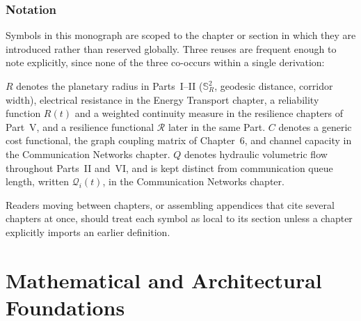 \documentclass[11pt,fleqn]{book}
\numberwithin{equation}{chapter}
\theoremstyle{plain}
\theoremstyle{definition}
\theoremstyle{remark}
\newcommand{\Sphere}{\mathbb{S}^{2}}
\begin{document}
\begin{abstract}
The resulting blueprint is developmental rather than terminal. Regions may construct low-capability implementations while retaining compatibility with more advanced sections elsewhere. Models, survey monuments, roads, hydraulic works, electrical systems, and megastructures can all instantiate the same protocol at different scales. Civilizations separated by centuries may therefore converge upon a common architecture without requiring synchronized construction, uniform technology, or a permanently centralized authority.
\end{abstract}

\tableofcontents

\section*{Notation}

Symbols in this monograph are scoped to the chapter or section in which
they are introduced rather than reserved globally. Three reuses are
frequent enough to note explicitly, since none of the three co-occurs
within a single derivation:

\(R\) denotes the planetary radius in Parts~I--II (\(\Sphere_R\),
geodesic distance, corridor width), electrical resistance in the
Energy Transport chapter, a reliability function \(R(t)\) and a
weighted continuity measure in the resilience chapters of Part~V, and
a resilience functional \(\mathcal R\) later in the same Part.
\(C\) denotes a generic cost functional, the graph coupling matrix of
Chapter~6, and channel capacity in the Communication Networks chapter.
\(Q\) denotes hydraulic volumetric flow throughout Parts~II and~VI,
and is kept distinct from communication queue length, written
\(\mathcal Q_i(t)\), in the Communication Networks chapter.

Readers moving between chapters, or assembling appendices that cite
several chapters at once, should treat each symbol as local to its
section unless a chapter explicitly imports an earlier definition.

\mainmatter


\part{Mathematical and Architectural Foundations}
\end{document}
